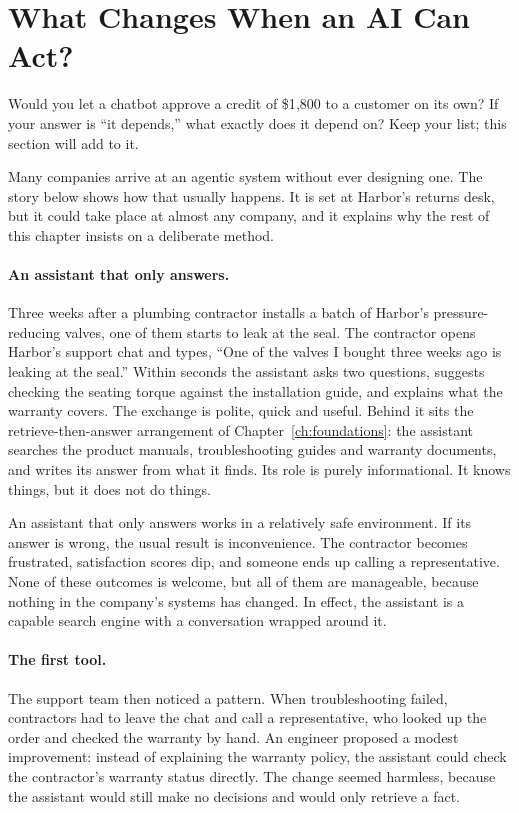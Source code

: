 \section{What Changes When an AI Can Act?}
\label{sec:answering-acting}

\begin{thinkabout}
Would you let a chatbot approve a credit of \$1{,}800 to a customer on its own? If your answer is ``it depends,'' what exactly does it depend on? Keep your list; this section will add to it.
\end{thinkabout}

Many companies arrive at an agentic system without ever designing one. The story below shows how that usually happens. It is set at Harbor's returns desk, but it could take place at almost any company, and it explains why the rest of this chapter insists on a deliberate method.

\paragraph{An assistant that only answers.} Three weeks after a plumbing contractor installs a batch of Harbor's pressure-reducing valves, one of them starts to leak at the seal. The contractor opens Harbor's support chat and types, ``One of the valves I bought three weeks ago is leaking at the seal.'' Within seconds the assistant asks two questions, suggests checking the seating torque against the installation guide, and explains what the warranty covers. The exchange is polite, quick and useful. Behind it sits the retrieve-then-answer arrangement of Chapter~\ref{ch:foundations}: the assistant searches the product manuals, troubleshooting guides and warranty documents, and writes its answer from what it finds. Its role is purely informational. It knows things, but it does not do things.

An assistant that only answers works in a relatively safe environment. If its answer is wrong, the usual result is inconvenience. The contractor becomes frustrated, satisfaction scores dip, and someone ends up calling a representative. None of these outcomes is welcome, but all of them are manageable, because nothing in the company's systems has changed. In effect, the assistant is a capable search engine with a conversation wrapped around it.

\paragraph{The first tool.} The support team then noticed a pattern. When troubleshooting failed, contractors had to leave the chat and call a representative, who looked up the order and checked the warranty by hand. An engineer proposed a modest improvement: instead of explaining the warranty policy, the assistant could check the contractor's warranty status directly. The change seemed harmless, because the assistant would still make no decisions and would only retrieve a fact.

